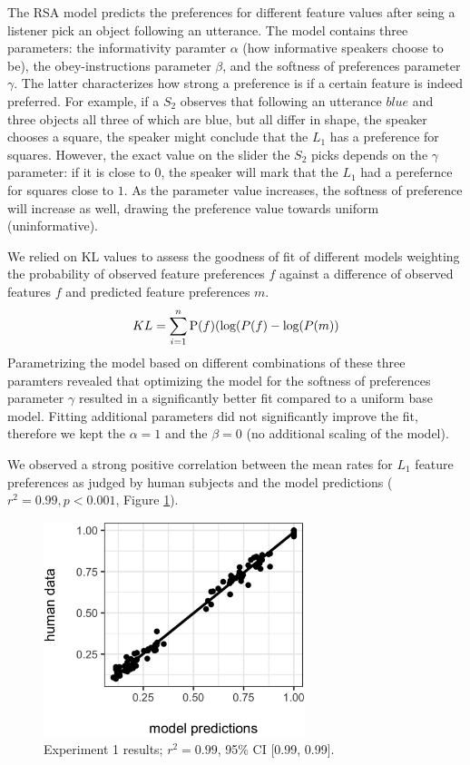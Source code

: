 \documentclass[10pt,a4paper]{article}
\begin{document}
The RSA model predicts the preferences for different feature values after seing a listener pick an object following an utterance. The model contains three parameters: the informativity paramter $\alpha$ (how informative speakers choose to be), the obey-instructions parameter $\beta$, and the softness of preferences parameter $\gamma$. The latter characterizes how strong a preference is if a certain feature is indeed preferred. For example, if a $S_2$ observes that following an utterance $blue$ and three objects all three of which are blue, but all differ in shape, the speaker chooses a square, the speaker might conclude that the $L_1$  has a preference for squares. However, the exact value on the slider the $S_2$ picks depends on the $\gamma$ parameter: if it is close to $0$, the speaker will mark that the $L_1$ had a perefernce for squares close to $1$. As the parameter value increases, the softness of preference will increase as well, drawing the preference value towards  uniform (uninformative).

We relied on KL values to assess the goodness of fit of different models weighting the probability of observed feature preferences $f$ against a difference of observed features $f$ and predicted feature preferences $m$.  
$$KL = \sum_{i=1}^{n}\textrm P(f) (\textrm {log} (P(f) - \textrm {log} (P(m)) $$
Parametrizing the model based on different combinations of these three paramters revealed that optimizing the model for the softness of preferences parameter $\gamma$ resulted in a significantly better fit compared to a uniform base model. Fitting additional parameters did not significantly improve the fit, therefore we kept the $\alpha = 1 $ and the $\beta = 0$ (no additional scaling of the model). 

We observed a strong positive correlation between the mean rates for $L_1$ feature preferences as judged by human subjects and the model predictions ($r^2 = 0.99, p < 0.001$, Figure \ref{exp1-results}).

\begin{figure}[ht]
	\centering
	\includegraphics[width=3in]{images/X2-scatter-CogSci.eps}
	\caption{Experiment 1 results; $r^{2}=0.99$, 95\% CI [0.99, 0.99].}\label{exp1-results}
\end{figure}
\end{document}

